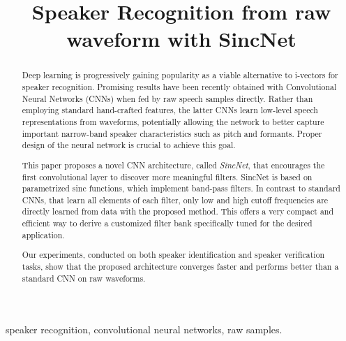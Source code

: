 \documentclass{article}
\title{Speaker Recognition from raw waveform with SincNet}
\begin{document}
%
\maketitle
%
\begin{abstract}
Deep learning is progressively gaining popularity as a viable alternative to i-vectors for speaker recognition. 
Promising results have been recently obtained with Convolutional Neural Networks (CNNs) when fed by raw speech samples directly. Rather than employing standard hand-crafted features, the latter CNNs learn low-level speech representations from waveforms, potentially allowing the network to better capture important narrow-band speaker characteristics such as pitch and formants. Proper design of the neural network is crucial to achieve this goal. 

This paper proposes a novel CNN architecture, called \textit{SincNet}, that encourages the first convolutional layer to discover more meaningful filters. SincNet is based on parametrized sinc functions, which implement band-pass filters. In contrast to standard CNNs, that learn all elements of each filter, only low and high cutoff frequencies are directly learned from data with the proposed method. This offers a very compact and efficient way to derive a customized filter bank specifically tuned for the desired application. 

Our experiments, conducted on both speaker identification and speaker verification tasks, show that the proposed architecture converges faster and performs better than a standard CNN on raw waveforms. 
\end{abstract}
%
\begin{keywords}
speaker recognition, convolutional neural networks, raw samples.
\end{keywords}
%
\end{document}
